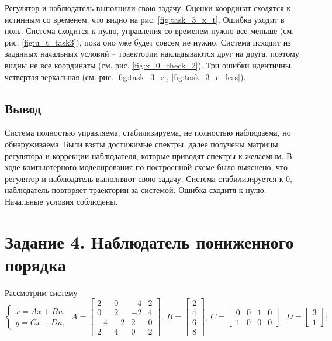 \documentclass[a4paper, 12pt]{article}
\begin{document}
    \noindent Регулятор и наблюдатель выполнили свою задачу.
    Оценки координат сходятся к истинным со временем, что видно на рис. \ref{fig:task_3_x_t}. Ошибка
    уходит в ноль. Система сходится к нулю, управления со временем нужно все меньше (см. рис. \ref{fig:u_t_task3}), пока
    оно уже будет совсем не нужно. Система исходит из заданных начальных условий -- траектории накладываются друг на друга,
    поэтому видны не все координаты (см. рис. \ref{fig:x_0_check_2}). Три ошибки идентичны, четвертая зеркальная (см. рис. \ref{fig:task_3_e}, \ref{fig:task_3_e_less}).


    \subsection{Вывод}
    Система полностью управляема, стабилизируема, не полностью наблюдаема, но обнаруживаема.
    Были взяты достижимые спектры, далее получены матрицы регулятора и коррекции наблюдателя,
    которые приводят спектры к желаемым. В ходе компьютерного моделирования по построенной схеме
    было выяснено, что регулятор и наблюдатель выполняют свою задачу. Система стабилизируется к 0,
    наблюдатель повторяет траектории за системой. Ошибка сходитя к нулю. Начальные условия соблюдены.


    \section{Задание 4. Наблюдатель пониженного порядка}
    Рассмотрим систему
    $$
    \begin{cases}
        \dot{x}=Ax+Bu,\\
        y=Cx+Du,
    \end{cases}\ A=\begin{bmatrix}
        2 &0 &-4 &2\\
        0 &2 &-2 &4\\
        -4 &-2 &2 &0\\
        2 &4 &0 &2
    \end{bmatrix},\ B=\begin{bmatrix}
        2\\
        4\\
        6\\
        8
    \end{bmatrix},\ C=\begin{bmatrix}
        0 &0 &1 &0\\
        1 &0 &0 &0
    \end{bmatrix},\ D=\begin{bmatrix}
        3\\1
    \end{bmatrix};
    $$
\end{document}
